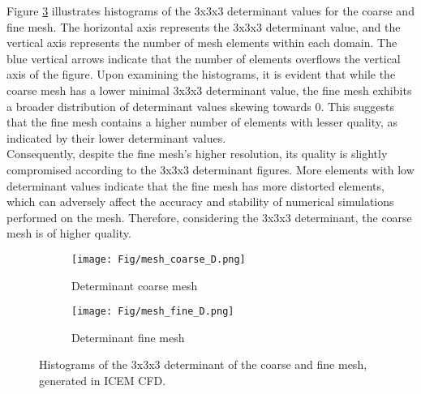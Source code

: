 Figure \ref{fig:determinant} illustrates histograms of the 3x3x3 determinant values for the coarse and fine mesh. The horizontal axis represents the 3x3x3 determinant value, and the vertical axis represents the number of mesh elements within each domain. The blue vertical arrows indicate that the number of elements overflows the vertical axis of the figure. Upon examining the histograms, it is evident that while the coarse mesh has a lower minimal 3x3x3 determinant value, the fine mesh exhibits a broader distribution of determinant values skewing towards 0. This suggests that the fine mesh contains a higher number of elements with lesser quality, as indicated by their lower determinant values. \\

Consequently, despite the fine mesh's higher resolution, its quality is slightly compromised according to the 3x3x3 determinant figures. More elements with low determinant values indicate that the fine mesh has more distorted elements, which can adversely affect the accuracy and stability of numerical simulations performed on the mesh. Therefore, considering the 3x3x3 determinant, the coarse mesh is of higher quality.



\begin{figure}[H]
  \centering
  \begin{subfigure}[b]{0.49\textwidth}
    \texttt{[image: Fig/mesh\_coarse\_D.png]}
    \caption{Determinant coarse mesh}
    \label{fig:coarseD}
  \end{subfigure}
  \hfill
  \begin{subfigure}[b]{0.49\textwidth}
    \texttt{[image: Fig/mesh\_fine\_D.png]}
    \caption{Determinant fine mesh}
    \label{fig:determinant}
  \end{subfigure}
  \caption{Histograms of the 3x3x3 determinant of the coarse and fine mesh, generated in ICEM CFD.}
\end{figure}




